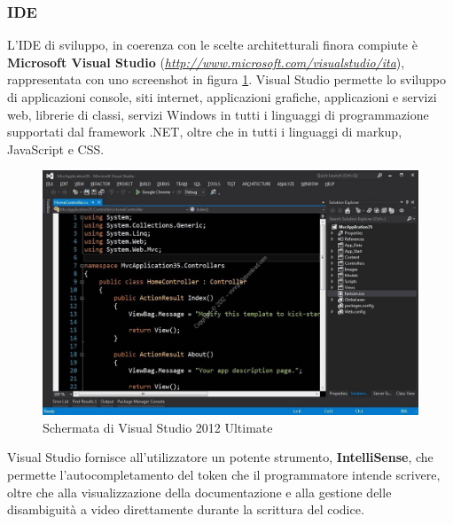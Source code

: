 \subsubsection{IDE}
L'IDE di sviluppo, in coerenza con le scelte architetturali finora compiute è \textbf{Microsoft Visual Studio} (\emph{\url{http://www.microsoft.com/visualstudio/ita}}), rappresentata con uno screenshot in figura \ref{vsimage}.
Visual Studio permette lo sviluppo di applicazioni console, siti internet, applicazioni grafiche, applicazioni e servizi web, librerie di classi, servizi Windows in tutti i linguaggi di programmazione supportati dal framework .NET, oltre che in tutti i linguaggi di markup, JavaScript e CSS.

\begin{figure}
\begin{center}

\includegraphics[scale=0.3]{imgs/visualstudio.jpg} 
\caption{Schermata di Visual Studio 2012 Ultimate\label{vsimage}}
\end{center}

\end{figure}
Visual Studio fornisce all’utilizzatore un potente strumento, \textbf{IntelliSense}, che permette
l'autocompletamento del token che il programmatore intende scrivere, oltre che
alla visualizzazione della documentazione e alla gestione delle disambiguità a
video direttamente durante la scrittura del codice.

